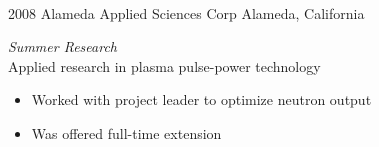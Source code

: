 \documentclass[]{friggeri-cv} %
\begin{document}
\begin{entrylist}
{\begin{itemize}
\begin{itemize}
\end{itemize}
\end{itemize}}
~~\\
\entry
{2008}
{Alameda Applied Sciences Corp}
{Alameda, California}
{\emph{Summer Research} \\
Applied research in plasma pulse-power technology
\begin{itemize}
\item Worked with project leader to optimize neutron output
\item Was offered full-time extension
\end{itemize}}
\end{entrylist}
~\\
%
\end{document}
